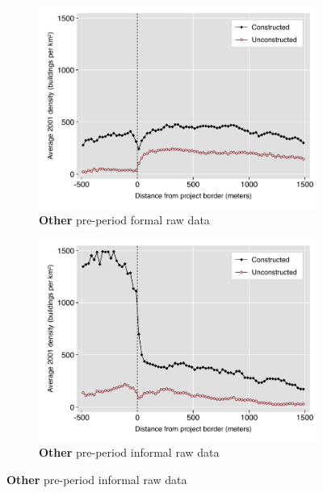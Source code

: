\documentclass[12pt]{article}
\begin{document}
\begin{figure}
\begin{subfigure}[b]{0.48\textwidth}
        \end{subfigure}
        \begin{subfigure}[b]{0.48\textwidth}
                    \caption[Network2]%
            {{\footnotesize \textbf{Other} pre-period formal  raw data}}   
            \label{fig:prefor}
            \centering
            \includegraphics[width=\textwidth,trim={0.3cm .3cm 0.1cm 0cm}, clip=true]{figures/bblu_for_pre_means_4_3_spk.pdf}

        \end{subfigure}
        \hfill
        \begin{subfigure}[b]{0.48\textwidth}  
                    \caption[]%
            {{\footnotesize \textbf{Other} pre-period informal  raw data}}      
            \label{fig:preinf}
            \centering 
            \includegraphics[width=\textwidth,trim={0.3cm .3cm 0.1cm 0cm}, clip=true]{figures/bblu_inf_pre_means_4_3_spk.pdf}

        \end{subfigure}
\end{figure}
\end{document}
